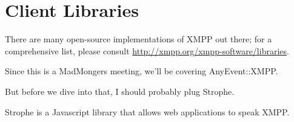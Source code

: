 \part{Client Libraries}

\newpage
There are many open-source implementations of XMPP out there; for a comprehensive list,
please consult \url{http://xmpp.org/xmpp-software/libraries}.

\newpage
Since this is a MadMongers meeting, we'll be covering AnyEvent::XMPP.

\newpage
But before we dive into that, I should probably plug Strophe.

\newpage
Strophe is a Javascript library that allows web applications to speak XMPP.
